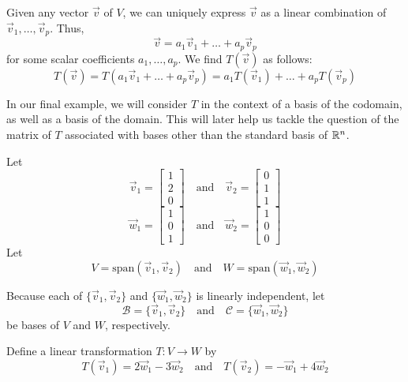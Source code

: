 \documentclass{ximera}
\begin{document}
Given any vector $\vec{v}$ of $V$, we can uniquely express $\vec{v}$ as a linear combination of $\vec{v}_1,\ldots,\vec{v}_p$.  Thus,
$$\vec{v}=a_1\vec{v}_1+\ldots+a_p\vec{v}_p$$ for some scalar coefficients $a_1,\ldots,a_p$.
We find $T(\vec{v})$ as follows:
$$T(\vec{v})=T(a_1\vec{v}_1+\ldots+a_p\vec{v}_p)=a_1T(\vec{v}_1)+\ldots+a_pT(\vec{v}_p)$$


In our final example, we will consider $T$ in the context of a basis of the codomain, as well as a basis of the domain.  This will later help us tackle the question of the matrix of $T$ associated with bases other than the standard basis of $\mathbb{R}^n$.

\begin{example}\label{ex:subtosub1}
Let
$$\vec{v}_1=\begin{bmatrix}1\\2\\0\end{bmatrix}\quad\text{and}\quad\vec{v}_2=\begin{bmatrix}0\\1\\1\end{bmatrix}$$
$$\vec{w}_1=\begin{bmatrix}1\\0\\1\end{bmatrix}\quad\text{and}\quad\vec{w}_2=\begin{bmatrix}1\\0\\0\end{bmatrix}$$
Let $$V=\text{span}(\vec{v}_1, \vec{v}_2)\quad\text{and}\quad W=\text{span}(\vec{w}_1, \vec{w}_2)$$

Because each of $\{\vec{v}_1, \vec{v}_2\}$ and $\{\vec{w}_1, \vec{w}_2\}$ is linearly independent, let 
$$\mathcal{B}=\{\vec{v}_1, \vec{v}_2\}\quad\text{and}\quad\mathcal{C}=\{\vec{w}_1, \vec{w}_2\}$$
be bases of $V$ and $W$, respectively.


Define a linear transformation $T:V\rightarrow W$ by 
$$T(\vec{v}_1)=2\vec{w}_1-3\vec{w}_2\quad\text{and} \quad T(\vec{v}_2)=-\vec{w}_1+4\vec{w}_2$$


\end{example}
\end{document}
